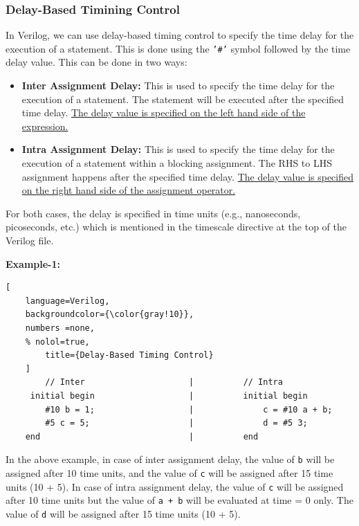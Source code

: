 \documentclass[12pt, a4paper]{article}
\begin{document}
\subsubsection{Delay-Based Timining Control}
In Verilog, we can use delay-based timing control to specify the time delay for the execution of a statement. This is done using the \texttt{'\#'} symbol followed by the time delay value. This can be done in two ways:

\begin{itemize}
    \item \textbf{Inter Assignment Delay:} This is used to specify the time delay for the execution of a statement. The statement will be executed after the specified time delay. \ul{The delay value is specified on the left hand side of the expression.}
    \item \textbf{Intra Assignment Delay:} This is used to specify the time delay for the execution of a statement within a blocking assignment. The RHS to LHS assignment happens after the specified time delay. \ul{The delay value is specified on the right hand side of the assignment operator.}
\end{itemize}

 For both cases, the delay is specified in time units (e.g., nanoseconds, picoseconds, etc.) which is mentioned in the timescale directive at the top of the Verilog file.

\vspace{0.5em}

\textbf{Example-1:}

\begin{lstlisting}[
    language=Verilog,
    backgroundcolor={\color{gray!10}},
    numbers =none,
    % nolol=true,
        title={Delay-Based Timing Control}
    ]
        // Inter                     |          // Intra
     initial begin                   |          initial begin
        #10 b = 1;                   |              c = #10 a + b;
        #5 c = 5;                    |              d = #5 3;
    end                              |          end
\end{lstlisting}

In the above example, in case of inter assignment delay, the value of \texttt{b} will be assigned after 10 time units, and the value of \texttt{c} will be assigned after 15 time units (10 + 5). In case of intra assignment delay, the value of \texttt{c} will be assigned after 10 time units but the value of \texttt{a + b} will be evaluated at time = 0 only. The value of \texttt{d} will be assigned after 15 time units (10 + 5).
\end{document}
